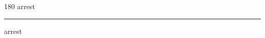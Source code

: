 
\begin{frame}
\begin{center}
\begin{turn}{180}
{\fontsize{2.5cm}{1em}\selectfont arrest}
\end{turn}
\vspace{1em}\par  
\hrule
\vspace{1em}\par  
{\fontsize{2.5cm}{1em}\selectfont arrest}
\end{center}
\end{frame}
